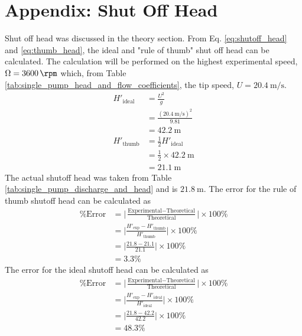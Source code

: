 \section{Appendix: Shut Off Head}
\label{sec:shut_off_head}
Shut off head was discussed in the theory section. From Eq. \ref{eq:shutoff_head} and \ref{eq:thumb_head}, the ideal and "rule of thumb" shut off head can be calculated. The calculation will be performed on the highest experimental speed, $\Omega = \qty{3600}{\rpm}$ which, from Table \ref{tab:single_pump_head_and_flow_coefficients}, the tip speed, $U = \qty{20.4}{\meter\per\second}$. 
\begin{align*}
    H'_\text{ideal} &= \frac{U^2}{g} \\
    &= \frac{(\qty{20.4}{\meter\per\second})^2}{9.81} \\
    &= \qty{42.2}{\meter} \\
    H'_\text{thumb} &= \frac{1}{2} H'_\text{ideal} \\
    &= \frac{1}{2} \times \qty{42.2}{\meter} \\
    &= \qty{21.1}{\meter}
\end{align*}
The actual shutoff head was taken from Table \ref{tab:single_pump_discharge_and_head} and is $\qty{21.8}{\meter}$. The error for the rule of thumb shutoff head can be calculated as
\begin{align*}
    \text{\% Error} &= \bigg|\frac{\text{Experimental} - \text{Theoretical}}{\text{Theoretical}}\bigg| \times 100\% \\
    &= \bigg|\frac{H'_\text{exp} - H'_\text{thumb}}{H'_\text{thumb}}\bigg| \times 100\% \\
    &= \bigg|\frac{21.8 - 21.1}{21.1}\bigg| \times 100\% \\
    &= 3.3\%
\end{align*}
The error for the ideal shutoff head can be calculated as
\begin{align*}
    \text{\% Error} &= \bigg|\frac{\text{Experimental} - \text{Theoretical}}{\text{Theoretical}}\bigg| \times 100\% \\
    &= \bigg|\frac{H'_\text{exp} - H'_\text{ideal}}{H'_\text{ideal}}\bigg| \times 100\% \\
    &= \bigg|\frac{21.8 - 42.2}{42.2}\bigg| \times 100\% \\
    &= 48.3\%
\end{align*}